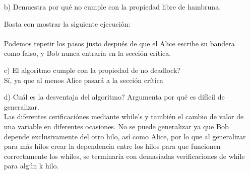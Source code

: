 \documentclass[12pt, letterpaper]{article}
\begin{document}
\begin{itemize}
\begin{itemize}
\begin{itemize}
\item[Caso 2.2] Bob no entra en el primer while\\
Entonces sabemos que no existe un escritura de flag[B] entre los dos eventos, siendo así, por transitividad de $\rightarrow$ entre 5) y 1) tenemos
$$8) write_B(flag[B] = true) \rightarrow read_A(flag[B] == false) $$
lo cual es una contradicción

\end{itemize}
Por lo tanto vemos que la suposición es incorrecta.\\
Por lo tanto si se resuelte el problema de la exlusión mutua.

\item[b) ]Demuestra por qu\'e no cumple con la propiedad libre de hambruna.

Basta con mostrar la siguiente ejecución:\\
\\
Podemos repetir los pasos justo después de que el Alice escribe su bandera como falso, y Bob nunca entraría en la sección crítica.

\item[c) ]El algoritmo cumple con la propiedad de no deadlock?\\
Sí, ya que al menos Alice pasará a la sección crítica
\item[d) ]Cu\'al es la desventaja del algoritmo? Argumenta por qu\'e es dif\'icil de
generalizar.\\
Las diferentes cerificaciónes mediante while's y también el cambio de valor de una variable en diferentes ocasiones. No se puede generalizar ya que Bob depende exclusivamente del otro hilo, así como Alice, por lo que al generalizar para más hilos crear la dependencia entre los hilos para que funcionen correctamente los whiles, se terminaría con demasiadas verificaciones de while para algún k hilo.


\end{itemize}
\end{itemize}
\end{document}
